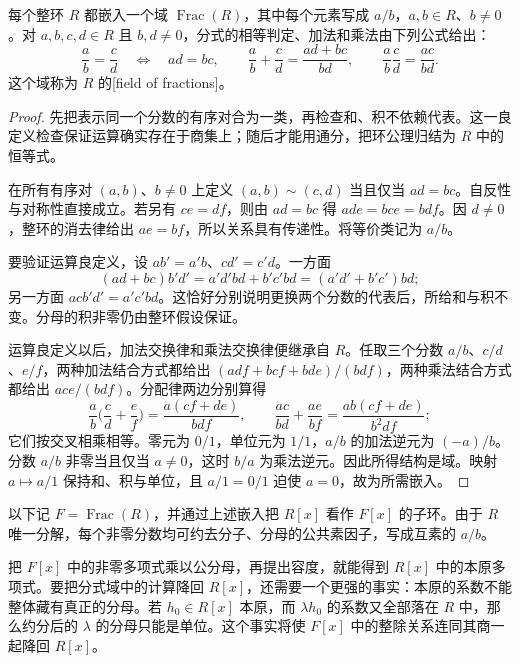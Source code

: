 \begin{proposition}\label{b1:prop:fraction-field-basic}
	每个整环 \(R\) 都嵌入一个域 \(\operatorname{Frac}(R)\)，其中每个元素写成 \(a/b\)，\(a,b\in R\)、\(b\ne0\)。对 \(a,b,c,d\in R\) 且 \(b,d\ne0\)，分式的相等判定、加法和乘法由下列公式给出：
	\[
		\frac ab=\frac cd\quad\Longleftrightarrow\quad ad=bc,\qquad \frac ab+\frac cd=\frac{ad+bc}{bd},\qquad \frac ab\frac cd=\frac{ac}{bd}.
	\]
	这个域称为 \(R\) 的[field of fractions]。
\end{proposition}
\begin{proof}
	先把表示同一个分数的有序对合为一类，再检查和、积不依赖代表。这一良定义检查保证运算确实存在于商集上；随后才能用通分，把环公理归结为 \(R\) 中的恒等式。

	在所有有序对 \((a,b)\)、\(b\ne0\) 上定义 \((a,b)\sim(c,d)\) 当且仅当 \(ad=bc\)。自反性与对称性直接成立。若另有 \(ce=df\)，则由 \(ad=bc\) 得 \(ade=bce=bdf\)。因 \(d\ne0\)，整环的消去律给出 \(ae=bf\)，所以关系具有传递性。将等价类记为 \(a/b\)。

	要验证运算良定义，设 \(ab'=a'b\)、\(cd'=c'd\)。一方面
	\[
		(ad+bc)b'd'=a'd'bd+b'c'bd=(a'd'+b'c')bd;
	\]
	另一方面 \(acb'd'=a'c'bd\)。这恰好分别说明更换两个分数的代表后，所给和与积不变。分母的积非零仍由整环假设保证。

	运算良定义以后，加法交换律和乘法交换律便继承自 \(R\)。任取三个分数 \(a/b\)、\(c/d\)、\(e/f\)，两种加法结合方式都给出 \((adf+bcf+bde)/(bdf)\)，两种乘法结合方式都给出 \(ace/(bdf)\)。分配律两边分别算得
	\[
		\frac ab\biggl(\frac cd+\frac ef\biggr) =\frac{a(cf+de)}{bdf},\qquad \frac{ac}{bd}+\frac{ae}{bf} =\frac{ab(cf+de)}{b^2df};
	\]
	它们按交叉相乘相等。零元为 \(0/1\)，单位元为 \(1/1\)，\(a/b\) 的加法逆元为 \((-a)/b\)。分数 \(a/b\) 非零当且仅当 \(a\ne0\)，这时 \(b/a\) 为乘法逆元。因此所得结构是域。映射 \(a\mapsto a/1\) 保持和、积与单位，且 \(a/1=0/1\) 迫使 \(a=0\)，故为所需嵌入。
\end{proof}

以下记 \(F=\operatorname{Frac}(R)\)，并通过上述嵌入把 \(R[x]\) 看作 \(F[x]\) 的子环。由于 \(R\) 唯一分解，每个非零分数均可约去分子、分母的公共素因子，写成互素的 \(a/b\)。

\ProseParagraphBreak
把 \(F[x]\) 中的非零多项式乘以公分母，再提出容度，就能得到 \(R[x]\) 中的本原多项式。要把分式域中的计算降回 \(R[x]\)，还需要一个更强的事实：本原的系数不能整体藏有真正的分母。若 \(h_0\in R[x]\) 本原，而 \(\lambda h_0\) 的系数又全部落在 \(R\) 中，那么约分后的 \(\lambda\) 的分母只能是单位。这个事实将使 \(F[x]\) 中的整除关系连同其商一起降回 \(R[x]\)。

